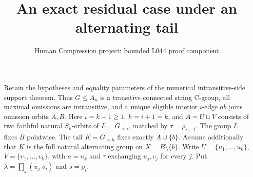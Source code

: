 \documentclass[11pt,a4paper]{article}
\title{An exact residual case under an alternating tail}
\author{Human Compression project: bounded L044 proof component}
\date{}
\begin{document}
\maketitle
Retain the hypotheses and equality parameters of the numerical
intransitive-side support theorem. Thus $G\leq A_n$ is a transitive
connected string C-group, all maximal omissions are intransitive,
and a unique eligible interior $i$-edge $ab$ joins omission
orbits $A,B$. Here $i=k-1\geq1$, $h=i+1=k$, and
$A=U\sqcup V$ consists of two faithful natural $S_k$-orbits
of $L=G_{<i}$, matched by $\tau=\rho_{i+1}$.
The group $L$ fixes $B$ pointwise.
The tail $K=G_{>h}$ fixes exactly $A\cup\{b\}$.
Assume additionally that $K$ is the full natural alternating
group on $X=B\setminus\{b\}$.
Write $U=\{u_1,\ldots,u_k\}$, $V=\{v_1,\ldots,v_k\}$,
with $a=u_k$ and $\tau$ exchanging $u_j,v_j$ for every $j$.
Put $\lambda=\prod_j(u_j\ v_j)$ and $s=\rho_i$.
\end{document}
